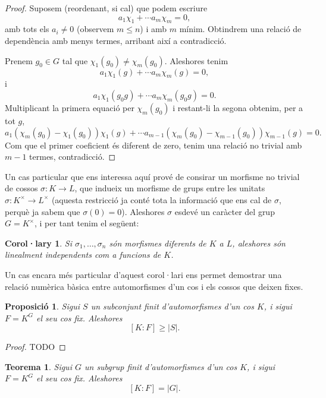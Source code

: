 \documentclass[
]{book}
\newtheorem{theorem}{Teorema}[chapter]
\newtheorem{corollary}{Corol·lary}[chapter]
\newtheorem{proposition}{Proposició}[chapter]
\theoremstyle{definition}
\theoremstyle{definition}
\theoremstyle{definition}
\theoremstyle{definition}
\theoremstyle{remark}
\begin{document}
\begin{proof}
Suposem (reordenant, si cal) que podem escriure
\[
a_1\chi_1 + \cdots a_m\chi_m = 0,
\]
amb tots els \(a_i\neq 0\) (observem \(m\leq n\)) i amb \(m\) mínim. Obtindrem una relació de dependència amb menys termes, arribant així a contradicció.

Prenem \(g_0\in G\) tal que \(\chi_1(g_0)\neq \chi_m(g_0)\). Aleshores tenim
\[
a_1\chi_1(g) + \cdots a_m\chi_m(g) = 0,
\]
i
\[
a_1\chi_1(g_0g) + \cdots a_m\chi_m(g_0g) = 0.
\]
Multiplicant la primera equació per \(\chi_m(g_0)\) i restant-li la segona obtenim, per a tot \(g\),
\[
a_1(\chi_m(g_0)-\chi_1(g_0)) \chi_1(g) + \cdots a_{m-1}(\chi_m(g_0)- \chi_{m-1}(g_0)) \chi_{m-1}(g) = 0.
\]
Com que el primer coeficient és diferent de zero, tenim una relació no trivial amb \(m-1\) termes, contradicció.
\end{proof}

Un cas particular que ens interessa aquí prové de consirar un morfisme no trivial de cossos \(\sigma\colon K\to L\),
que indueix un morfisme de grups entre les unitats \(\sigma\colon K^\times \to L^\times\) (aquesta restricció ja conté
tota la informació que ens cal de \(\sigma\), perquè ja sabem que \(\sigma(0)=0\)). Aleshores \(\sigma\) esdevé un caràcter
del grup \(G=K^\times\), i per tant tenim el següent:

\begin{corollary}
Si \(\sigma_1,\ldots,\sigma_n\) són morfismes diferents de \(K\) a \(L\), aleshores són linealment independents com a funcions de \(K\).
\end{corollary}

Un cas encara més particular d'aquest corol·lari ens permet demostrar una relació numèrica bàsica entre automorfismes d'un cos
i els cossos que deixen fixes.

\begin{proposition}
Sigui \(S\) un subconjunt finit d'automorfismes d'un cos \(K\), i sigui \(F=K^G\) el seu cos fix. Aleshores
\[
[K\colon F] \geq |S|.
\]
\end{proposition}

\begin{proof}
TODO
\end{proof}

\begin{theorem}
Sigui \(G\) un subgrup finit d'automorfismes d'un cos \(K\), i sigui \(F=K^G\) el seu cos fix. Aleshores
\[
[K\colon F] = |G|.
\]
\end{theorem}
\end{document}
